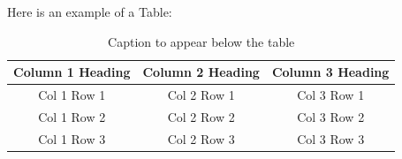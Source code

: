 Here is an example of a Table:

\begin{table}

    \begin{center}


    \begin{tabular}[c]{|c|c|c|}
        \hline
        Column 1 Heading & Column 2 Heading & Column 3 Heading \\
        \hline
        Col 1 Row 1 & Col 2 Row 1 & Col 3 Row 1\\
        Col 1 Row 2 & Col 2 Row 2 & Col 3 Row 2\\
        Col 1 Row 3 & Col 2 Row 3 & Col 3 Row 3\\
        \hline
    \end{tabular}
    \caption{Caption to appear below the table}
    \label{table1}
   \end{center}
\end{table}


